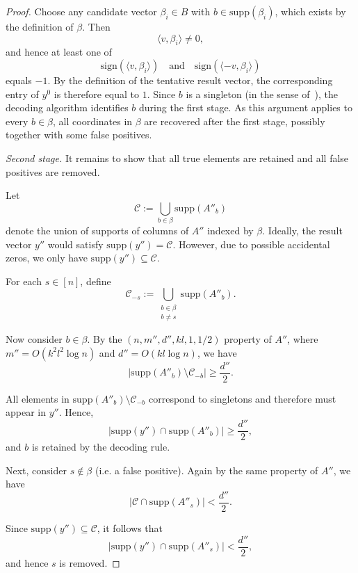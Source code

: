 \documentclass[10pt,a4paper]{amsart}
\newcommand{\supp}{\mathrm{supp}}
\newcommand{\sign}{\mathrm{sign}}
\begin{document}
\begin{proof}
Choose any candidate vector $\beta_i\in B$ with $b\in\supp(\beta_i)$, which exists by the definition of $\beta$. Then
\[
\langle v,\beta_i\rangle\neq0,
\]
and hence at least one of
\[
\sign(\langle v,\beta_i\rangle)
\quad\text{and}\quad
\sign(\langle -v,\beta_i\rangle)
\]
equals $-1$. By the definition of the tentative result vector, the corresponding entry of $y^0$ is therefore equal to $1$. Since $b$ is a singleton (in the sense of~\cite{li2025support}), the decoding algorithm identifies $b$ during the first stage. As this argument applies to every $b\in\beta$, all coordinates in $\beta$ are recovered after the first stage, possibly together with some false positives.

\medskip

\emph{Second stage.}
It remains to show that all true elements are retained and all false positives are removed.

Let
\[
\mathcal{C} := \bigcup_{b \in \beta} \supp(A''_b)
\]
denote the union of supports of columns of $A''$ indexed by $\beta$. Ideally, the result vector $y''$ would satisfy $\supp(y'') = \mathcal{C}$. However, due to possible accidental zeros, we only have $\supp(y'') \subseteq \mathcal{C}$.

For each $s \in [n]$, define
\[
\mathcal{C}_{-s} := \bigcup_{\substack{b \in \beta \\ b \neq s}} \supp(A''_b).
\]

\medskip

Now consider $b \in \beta$. By the $(n,m'',d'',kl,1,1/2)$ property of $A''$, where $m'' = O(k^2 l^2 \log n)$ and $d'' = O(kl \log n)$, we have
\[
|\supp(A''_b) \setminus \mathcal{C}_{-b}| \geq \frac{d''}{2}.
\]

All elements in $\supp(A''_b) \setminus \mathcal{C}_{-b}$ correspond to singletons and therefore must appear in $y''$. Hence,
\[
|\supp(y'') \cap \supp(A''_b)| \geq \frac{d''}{2},
\]
and $b$ is retained by the decoding rule.

\medskip

Next, consider $s \notin \beta$ (i.e. a false positive). Again by the same property of $A''$, we have
\[
|\mathcal{C} \cap \supp(A''_s)| < \frac{d''}{2}.
\]

Since $\supp(y'') \subseteq \mathcal{C}$, it follows that
\[
|\supp(y'') \cap \supp(A''_s)| < \frac{d''}{2},
\]
and hence $s$ is removed.
\end{proof}
\end{document}
